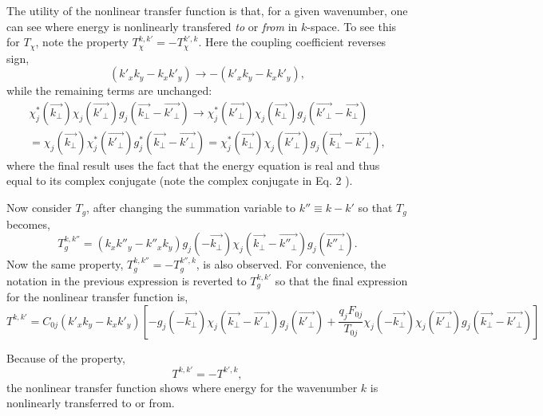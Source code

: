 \documentclass[11pt]{article}
\begin{document}
\begin{titlepage}
{The utility of the nonlinear transfer function is that, for a given wavenumber, one can see where energy is nonlinearly transfered \emph{to} or \emph{from} in $k$-space.  To see this for $T_\chi$, note the property $T_\chi^{k,k'}=-T_\chi^{k',k}$.  Here the coupling coefficient reverses sign,   
\begin{equation}
(k'_xk_y-k_xk'_y)\rightarrow-(k'_xk_y-k_xk'_y),
\label{coupling1}
\end{equation}
while the remaining terms are unchanged:
\begin{eqnarray}
\nonumber &\chi^*_j(\vec{k_{\perp}}) \chi_j(\vec{k'_{\perp}})    g_j(\vec{k_{\perp}}-\vec{k'_{\perp}}) \rightarrow \chi^*_j(\vec{k'_{\perp}}) \chi_j(\vec{k_{\perp}}) g_j(\vec{k'_{\perp}}-\vec{k_{\perp}})&\\
&=\chi_j(\vec{k_{\perp}}) \chi^*_j(\vec{k'_{\perp}})    g^*_j(\vec{k_{\perp}}-\vec{k'_{\perp}})=\chi^*_j(\vec{k_{\perp}}) \chi_j(\vec{k'_{\perp}})    g_j(\vec{k_{\perp}}-\vec{k'_{\perp}}),
\label{}
\end{eqnarray}
where the final result uses the fact that the energy equation is real and thus equal to its complex conjugate (note the complex conjugate in Eq. 2 ).

Now consider $T_g$, after changing the summation variable to $k''\equiv k-k'  $ so that $T_g$ becomes,
\begin{equation}
T_g^{k,k''}=(k_xk''_y-k''_xk_y)   g_j(-\vec{k_{\perp}}) \chi_j(\vec{k_{\perp}}-\vec{k''_{\perp}})    g_j(\vec{k''_{\perp}}).
\label{}
\end{equation}
Now the same property, $T_g^{k,k''}=-T_g^{k'',k}$, is also observed.  For convenience, the notation in the previous expression is reverted to $T_g^{k,k'}$ so that the final expression for the nonlinear transfer function is,
\begin{equation}
T^{k,k'}=C_{0j}(k'_xk_y-k_xk'_y) \left[  -g_j(-\vec{k_{\perp}}) \chi_j(\vec{k_{\perp}}-\vec{k'_{\perp}})    g_j(\vec{k'_{\perp}})+\frac{q_jF_{0j}}{T_{0j}}   \chi_j(-\vec{k_{\perp}}) \chi_j(\vec{k'_{\perp}})    g_j(\vec{k_{\perp}}-\vec{k'_{\perp}}) \right ]
\label{}
\end{equation}


Because of the property,  
\begin{equation}
T^{k,k'}=-T^{k',k},
\label{}
\end{equation}
the nonlinear transfer function shows where energy for the wavenumber $k$ is nonlinearly transferred to or from.  


}
\end{titlepage}
\end{document}
